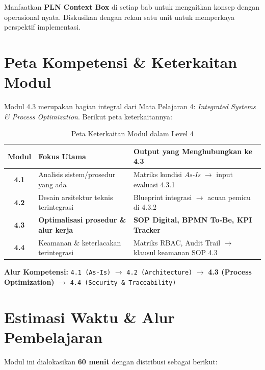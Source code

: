 \documentclass[12pt,a4paper]{report}
\begin{document}
\begin{plnbox}
Manfaatkan \textbf{PLN Context Box} di setiap bab untuk mengaitkan konsep dengan operasional nyata. Diskusikan dengan rekan satu unit untuk memperkaya perspektif implementasi.
\end{plnbox}

\section*{Peta Kompetensi \& Keterkaitan Modul}
Modul 4.3 merupakan bagian integral dari Mata Pelajaran 4: \textit{Integrated Systems \& Process Optimization}. Berikut peta keterkaitannya:

\begin{table}[htbp]
\centering
\small
\caption{Peta Keterkaitan Modul dalam Level 4}
\begin{tabularx}{\textwidth}{@{} c >{\raggedright\arraybackslash}X >{\raggedright\arraybackslash}X @{}}
\toprule
\textbf{Modul} & \textbf{Fokus Utama} & \textbf{Output yang Menghubungkan ke 4.3} \\
\midrule
\textbf{4.1} & Analisis sistem/prosedur yang ada & Matriks kondisi \textit{As-Is} $\rightarrow$ input evaluasi 4.3.1 \\
\textbf{4.2} & Desain arsitektur teknis terintegrasi & Blueprint integrasi $\rightarrow$ acuan pemicu di 4.3.2 \\
\textbf{4.3} & \textbf{Optimalisasi prosedur \& alur kerja} & \textbf{SOP Digital, BPMN To-Be, KPI Tracker} \\
\textbf{4.4} & Keamanan \& keterlacakan terintegrasi & Matriks RBAC, Audit Trail $\rightarrow$ klausul keamanan SOP 4.3 \\
\bottomrule
\end{tabularx}
\end{table}

\textbf{Alur Kompetensi:} \texttt{4.1 (As-Is)} $\rightarrow$ \texttt{4.2 (Architecture)} $\rightarrow$ \textbf{4.3 (Process Optimization)} $\rightarrow$ \texttt{4.4 (Security \& Traceability)}

\section*{Estimasi Waktu \& Alur Pembelajaran}
Modul ini dialokasikan \textbf{60 menit} dengan distribusi sebagai berikut:
\end{document}
